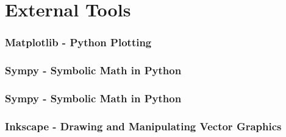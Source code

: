 \documentclass{beamer}
\begin{document}
    \section{External Tools}
        \begin{frame}
            \frametitle{Matplotlib - Python Plotting}
        \end{frame}
        \begin{frame}
            \frametitle{Sympy - Symbolic Math in Python}
        \end{frame}
        \begin{frame}
            \frametitle{Sympy - Symbolic Math in Python}
        \end{frame}
        \begin{frame}
            \frametitle{Inkscape - Drawing and Manipulating Vector Graphics}
        \end{frame}
\end{document}
